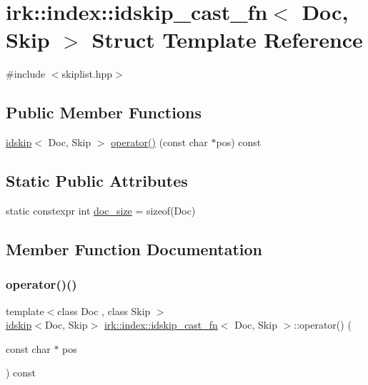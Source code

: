 \hypertarget{structirk_1_1index_1_1idskip__cast__fn}{}\section{irk\+:\+:index\+:\+:idskip\+\_\+cast\+\_\+fn$<$ Doc, Skip $>$ Struct Template Reference}
\label{structirk_1_1index_1_1idskip__cast__fn}


{\ttfamily \#include $<$skiplist.\+hpp$>$}

\subsection*{Public Member Functions}
\begin{DoxyCompactItemize}
\item 
\mbox{\hyperlink{structirk_1_1index_1_1idskip}{idskip}}$<$ Doc, Skip $>$ \mbox{\hyperlink{structirk_1_1index_1_1idskip__cast__fn_ac40a64cb7b7c7f036843169c4cc1363c}{operator()}} (const char $\ast$pos) const
\end{DoxyCompactItemize}
\subsection*{Static Public Attributes}
\begin{DoxyCompactItemize}
\item 
static constexpr int \mbox{\hyperlink{structirk_1_1index_1_1idskip__cast__fn_af5ddc933343dae09e7b2a74e87880f8f}{doc\+\_\+size}} = sizeof(Doc)
\end{DoxyCompactItemize}


\subsection{Member Function Documentation}
\mbox{\label{structirk_1_1index_1_1idskip__cast__fn_ac40a64cb7b7c7f036843169c4cc1363c}} 
\subsubsection{\texorpdfstring{operator()()}{operator()()}}
{\footnotesize\ttfamily template$<$class Doc , class Skip $>$ \\
\mbox{\hyperlink{structirk_1_1index_1_1idskip}{idskip}}$<$Doc, Skip$>$ \mbox{\hyperlink{structirk_1_1index_1_1idskip__cast__fn}{irk\+::index\+::idskip\+\_\+cast\+\_\+fn}}$<$ Doc, Skip $>$\+::operator() (\begin{DoxyParamCaption}\item[{const char $\ast$}]{pos }\end{DoxyParamCaption}) const\hspace{0.3cm}{\ttfamily [inline]}}



